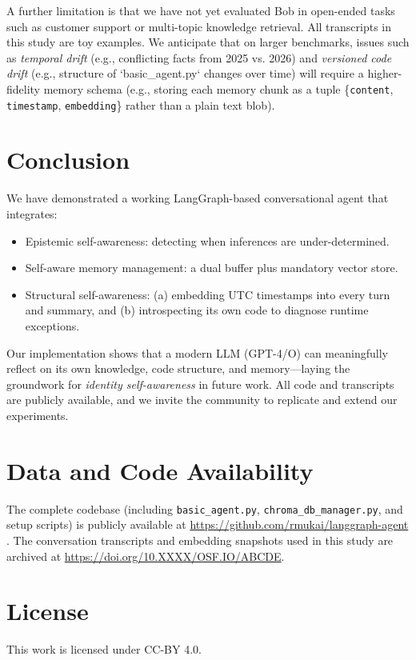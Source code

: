 \documentclass[11pt]{article}
\begin{document}
A further limitation is that we have not yet evaluated Bob in open-ended tasks such as customer support or multi-topic knowledge retrieval. All transcripts in this study are toy examples. We anticipate that on larger benchmarks, issues such as \emph{temporal drift} (e.g., conflicting facts from 2025 vs. 2026) and \emph{versioned code drift} (e.g., structure of `basic_agent.py` changes over time) will require a higher-fidelity memory schema (e.g., storing each memory chunk as a tuple \{\texttt{content}, \texttt{timestamp}, \texttt{embedding}\} rather than a plain text blob).

\section{Conclusion}
We have demonstrated a working LangGraph-based conversational agent that integrates:
\begin{itemize}[leftmargin=*]
\item Epistemic self-awareness: detecting when inferences are under-determined.
\item Self-aware memory management: a dual buffer plus mandatory vector store.
\item Structural self-awareness: (a) embedding UTC timestamps into every turn and summary, and (b) introspecting its own code to diagnose runtime exceptions.
\end{itemize}
Our implementation shows that a modern LLM (GPT-4/O) can meaningfully reflect on its own knowledge, code structure, and memory—laying the groundwork for \emph{identity self-awareness} in future work. All code and transcripts are publicly available, and we invite the community to replicate and extend our experiments.  

\section*{Data and Code Availability}
The complete codebase (including \texttt{basic\_agent.py}, \texttt{chroma\_db\_manager.py}, and setup scripts) is publicly available at \url{https://github.com/rmukai/langgraph-agent} \cite{LangGraphAgent2025}. The conversation transcripts and embedding snapshots used in this study are archived at \url{https://doi.org/10.XXXX/OSF.IO/ABCDE}.

\section*{License}
This work is licensed under CC-BY 4.0.
\end{document}
